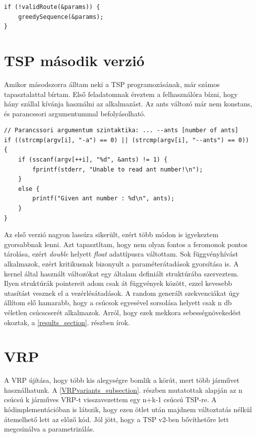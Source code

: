 \begin{lstlisting}[style=CStyle,showstringspaces=false]
if (!validRoute(&params)) {
	greedySequence(&params);
}
\end{lstlisting}

\section{TSP második verzió}
Amikor másodszorra álltam neki a TSP programozásának, már számos tapasztalattal bírtam. Első feladatomnak éreztem a felhasználóra bízni, hogy hány szállal kívánja használni az alkalmazást. Az ants változó már nem konstans, és parancssori argumentummal befolyásolható.

\begin{lstlisting}[style=CStyle,showstringspaces=false]
// Parancssori argumentum szintaktika: ... --ants [number of ants]
if ((strcmp(argv[i], "-a") == 0) || (strcmp(argv[i], "--ants") == 0))
{
	if (sscanf(argv[++i], "%d", &ants) != 1) {
		fprintf(stderr, "Unable to read ant number!\n");
	}
	else {
		printf("Given ant number : %d\n", ants);
	}
}
\end{lstlisting}

 Az első verzió nagyon lassúra sikerült, ezért több módon is igyekeztem gyorsabbnak lenni. Azt tapasztltam, hogy nem olyan fontos a feromonok pontos tárolása, ezért \textit{double} helyett \textit{float} adattípusra váltottam. 
 Sok függvényhívást alkalmazok, ezért kritikusnak bizonyult a paraméterátadások gyorsítása is. A kernel által használt változókat egy általam definiált struktúrába szerveztem. Ilyen struktúrák pointereit adom csak át függvények között, ezzel kevesebb utasítást vesznek el a vezérlésátadások. A random generált szekvenciákat úgy állítom elő hamarabb, hogy a csúcsok egyesével sorsolása helyett csak n db véletlen csúcscserét alkalmazok. Arról, hogy ezek mekkora sebességnövekedést okoztak, a \ref{results_section}. részben írok.

\section{VRP}

A VRP újítása, hogy több kis alegységre bomlik a körút, mert több járművet használhatunk. A \ref{VRPvariants_subsection}. részben mutatottak alapján az n csúcsú k járműves VRP-t visszavezettem egy n+k-1 csúcsú TSP-re. A kódimplementációban is látszik, hogy ezen ötlet után majdnem változtatás nélkül átemelhető lett az előző kód. Jól jött, hogy a TSP v2-ben bővíthetőre lett megcsinálva a parametrizálás.

